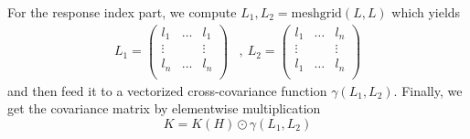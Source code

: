 \documentclass[a4paper,10pt]{article}
\begin{document}
For the response index part, we compute $L_1, L_2=\textrm{meshgrid}\left(L,
L\right)$ which yields
\begin{align*}
    L_1 =  \begin{pmatrix}
        l_1 & \dots & l_1\\
        \vdots &  & \vdots \\
        l_n & \dots & l_n\\
    \end{pmatrix}
    &,~ 
    L_2 =  \begin{pmatrix}
        l_1 & \dots & l_n\\
        \vdots &  & \vdots \\
        l_1 & \dots & l_n\\
    \end{pmatrix}
\end{align*}
and then feed it to a vectorized cross-covariance function $\gamma(L_1, L_2)$.
Finally, we get the covariance matrix by elementwise multiplication
\[
    K = K\left(H\right) \odot \gamma\left(L_1, L_2\right)
\]
\end{document}
